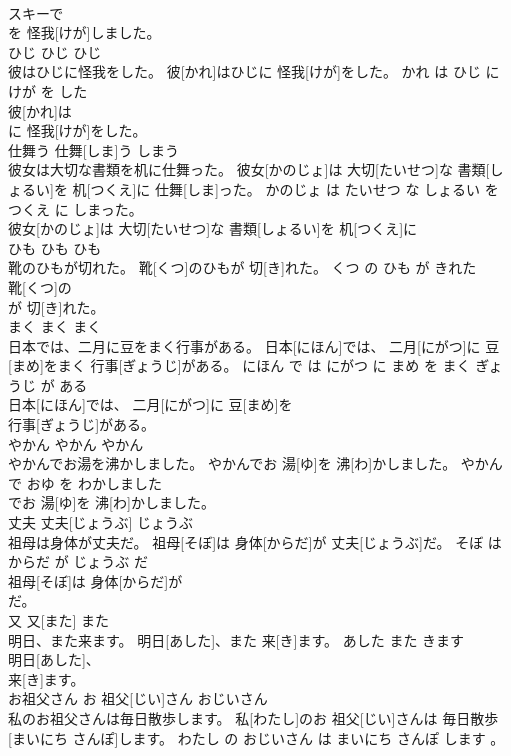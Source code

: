 \documentclass[8pt]{extreport}
\begin{document}
\begin{CJK}{UTF8}{min}
\\	スキーで
\\	を 怪我[けが]しました。			
\\	ひじ	ひじ	ひじ	
\\	彼はひじに怪我をした。	彼[かれ]はひじに 怪我[けが]をした。	かれ は ひじ に けが を した	
\\	彼[かれ]は
\\	に 怪我[けが]をした。			
\\	仕舞う	仕舞[しま]う	しまう	
\\	彼女は大切な書類を机に仕舞った。	彼女[かのじょ]は 大切[たいせつ]な 書類[しょるい]を 机[つくえ]に 仕舞[しま]った。	かのじょ は たいせつ な しょるい を つくえ に しまった。	
\\	彼女[かのじょ]は 大切[たいせつ]な 書類[しょるい]を 机[つくえ]に
\\	ひも	ひも	ひも	
\\	靴のひもが切れた。	靴[くつ]のひもが 切[き]れた。	くつ の ひも が きれた	
\\	靴[くつ]の
\\	が 切[き]れた。			
\\	まく	まく	まく	
\\	日本では、二月に豆をまく行事がある。	日本[にほん]では、 二月[にがつ]に 豆[まめ]をまく 行事[ぎょうじ]がある。	にほん で は にがつ に まめ を まく ぎょうじ が ある	
\\	日本[にほん]では、 二月[にがつ]に 豆[まめ]を
\\	行事[ぎょうじ]がある。			
\\	やかん	やかん	やかん	
\\	やかんでお湯を沸かしました。	やかんでお 湯[ゆ]を 沸[わ]かしました。	やかん で おゆ を わかしました	
\\	でお 湯[ゆ]を 沸[わ]かしました。			
\\	丈夫	丈夫[じょうぶ]	じょうぶ	
\\	祖母は身体が丈夫だ。	祖母[そぼ]は 身体[からだ]が 丈夫[じょうぶ]だ。	そぼ は からだ が じょうぶ だ	
\\	祖母[そぼ]は 身体[からだ]が
\\	だ。			
\\	又	又[また]	また	
\\	明日、また来ます。	明日[あした]、また 来[き]ます。	あした また きます	
\\	明日[あした]、
\\	来[き]ます。			
\\	お祖父さん	お 祖父[じい]さん	おじいさん	
\\	私のお祖父さんは毎日散歩します。	私[わたし]のお 祖父[じい]さんは 毎日散歩[まいにち さんぽ]します。	わたし の おじいさん は まいにち さんぽ します 。	

\end{CJK}
\end{document}
